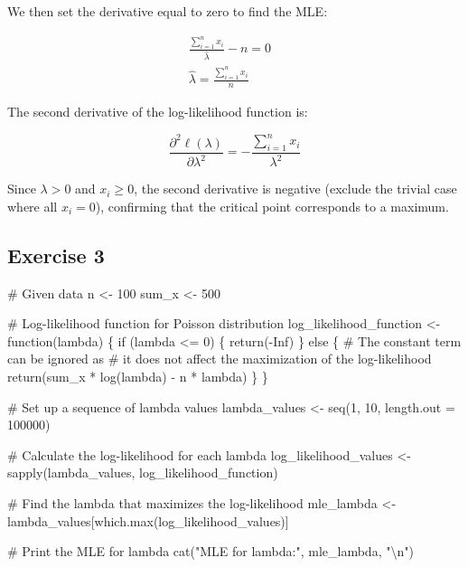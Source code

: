 \documentclass[
  letterpaper,
  DIV=11,
  numbers=noendperiod]{scrartcl}
\newenvironment{Shaded}{\begin{snugshade}}{\end{snugshade}}
\newcommand{\AttributeTok}[1]{\textcolor[rgb]{0.40,0.45,0.13}{#1}}
\newcommand{\CommentTok}[1]{\textcolor[rgb]{0.37,0.37,0.37}{#1}}
\newcommand{\ConstantTok}[1]{\textcolor[rgb]{0.56,0.35,0.01}{#1}}
\newcommand{\ControlFlowTok}[1]{\textcolor[rgb]{0.00,0.23,0.31}{#1}}
\newcommand{\DecValTok}[1]{\textcolor[rgb]{0.68,0.00,0.00}{#1}}
\newcommand{\FunctionTok}[1]{\textcolor[rgb]{0.28,0.35,0.67}{#1}}
\newcommand{\NormalTok}[1]{\textcolor[rgb]{0.00,0.23,0.31}{#1}}
\newcommand{\OtherTok}[1]{\textcolor[rgb]{0.00,0.23,0.31}{#1}}
\newcommand{\SpecialCharTok}[1]{\textcolor[rgb]{0.37,0.37,0.37}{#1}}
\newcommand{\StringTok}[1]{\textcolor[rgb]{0.13,0.47,0.30}{#1}}
\begin{document}
We then set the derivative equal to zero to find the MLE:

\[
\begin{aligned} \frac{\sum_{i=1}^n x_i}{\hat{\lambda}} - n = 0& \\\hat{\lambda} = \frac{\sum_{i=1}^n x_i}{n}&\end{aligned}
\]

The second derivative of the log-likelihood function is:

\[
\frac{\partial^2 \ell(\lambda)}{\partial \lambda^2} = -\frac{\sum_{i=1}^n x_i}{\lambda^2}
\]

Since \(\lambda > 0\) and \(x_i \geq 0\), the second derivative is
negative (exclude the trivial case where all \(x_i=0\)), confirming that
the critical point corresponds to a maximum.

\clearpage

\subsection{Exercise 3}\label{exercise-3}

\begin{Shaded}
\begin{Highlighting}[]
\CommentTok{\# Given data}
\NormalTok{n }\OtherTok{\textless{}{-}} \DecValTok{100}
\NormalTok{sum\_x }\OtherTok{\textless{}{-}} \DecValTok{500}

\CommentTok{\# Log{-}likelihood function for Poisson distribution}
\NormalTok{log\_likelihood\_function }\OtherTok{\textless{}{-}} \ControlFlowTok{function}\NormalTok{(lambda) \{}
  \ControlFlowTok{if}\NormalTok{ (lambda }\SpecialCharTok{\textless{}=} \DecValTok{0}\NormalTok{) \{}
    \FunctionTok{return}\NormalTok{(}\SpecialCharTok{{-}}\ConstantTok{Inf}\NormalTok{)}
\NormalTok{  \} }\ControlFlowTok{else}\NormalTok{ \{}
    \CommentTok{\# The constant term can be ignored as }
    \CommentTok{\# it does not affect the maximization of the log{-}likelihood}
    \FunctionTok{return}\NormalTok{(sum\_x }\SpecialCharTok{*} \FunctionTok{log}\NormalTok{(lambda) }\SpecialCharTok{{-}}\NormalTok{ n }\SpecialCharTok{*}\NormalTok{ lambda)}
\NormalTok{  \}}
\NormalTok{\}}

\CommentTok{\# Set up a sequence of lambda values}
\NormalTok{lambda\_values }\OtherTok{\textless{}{-}} \FunctionTok{seq}\NormalTok{(}\DecValTok{1}\NormalTok{, }\DecValTok{10}\NormalTok{, }\AttributeTok{length.out =} \DecValTok{100000}\NormalTok{)}

\CommentTok{\# Calculate the log{-}likelihood for each lambda}
\NormalTok{log\_likelihood\_values }\OtherTok{\textless{}{-}} \FunctionTok{sapply}\NormalTok{(lambda\_values, log\_likelihood\_function)}

\CommentTok{\# Find the lambda that maximizes the log{-}likelihood}
\NormalTok{mle\_lambda }\OtherTok{\textless{}{-}}\NormalTok{ lambda\_values[}\FunctionTok{which.max}\NormalTok{(log\_likelihood\_values)]}

\CommentTok{\# Print the MLE for lambda}
\FunctionTok{cat}\NormalTok{(}\StringTok{"MLE for lambda:"}\NormalTok{, mle\_lambda, }\StringTok{"}\SpecialCharTok{\textbackslash{}n}\StringTok{"}\NormalTok{)}
\end{Highlighting}
\end{Shaded}
\end{document}

